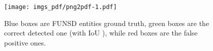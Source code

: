 \documentclass[runningheads]{llncs}
\begin{document}
\begin{table}[t!]
    \centering
    \caption{\textbf{Entity detection results}. YOLOv5 \cite{YOLOv5}-small performances on the entity detection task.}
    \label{tab:iou_f1}
\end{table}

\begin{figure}[t]
    \centering
    \texttt{[image: imgs\_pdf/png2pdf-1.pdf]}
    \caption{Blue boxes are FUNSD entities ground truth, green boxes are the correct detected one (with IoU ), while red boxes are the false positive ones.}
    \label{fig:det}
\end{figure}
\end{document}

